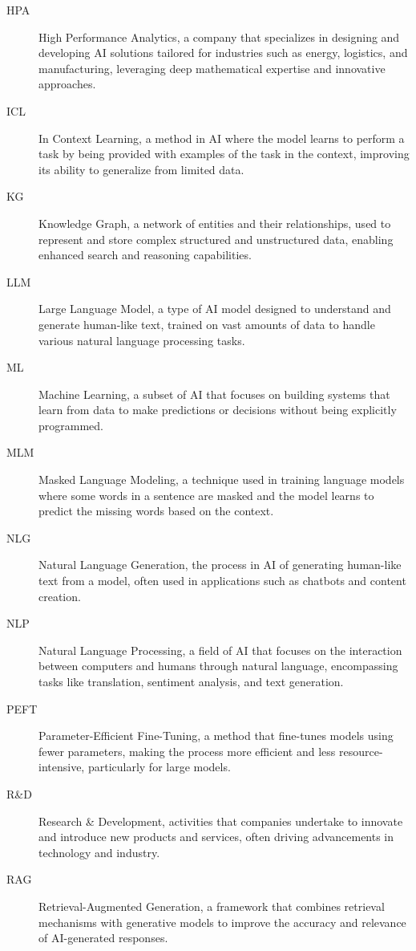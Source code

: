 \begin{description}
    \item[HPA] High Performance Analytics, a company that specializes in designing and developing AI solutions tailored for industries such as energy, logistics, and manufacturing, leveraging deep mathematical expertise and innovative approaches.
    \item[ICL] In Context Learning, a method in AI where the model learns to perform a task by being provided with examples of the task in the context, improving its ability to generalize from limited data.
    \item[KG] Knowledge Graph, a network of entities and their relationships, used to represent and store complex structured and unstructured data, enabling enhanced search and reasoning capabilities.
    \item[LLM] Large Language Model, a type of AI model designed to understand and generate human-like text, trained on vast amounts of data to handle various natural language processing tasks.
    \item[ML] Machine Learning, a subset of AI that focuses on building systems that learn from data to make predictions or decisions without being explicitly programmed.
    \item[MLM] Masked Language Modeling, a technique used in training language models where some words in a sentence are masked and the model learns to predict the missing words based on the context.
    \item[NLG] Natural Language Generation, the process in AI of generating human-like text from a model, often used in applications such as chatbots and content creation.
    \item[NLP] Natural Language Processing, a field of AI that focuses on the interaction between computers and humans through natural language, encompassing tasks like translation, sentiment analysis, and text generation.
    \item[PEFT] Parameter-Efficient Fine-Tuning, a method that fine-tunes models using fewer parameters, making the process more efficient and less resource-intensive, particularly for large models.
    \item[R\&D] Research \& Development, activities that companies undertake to innovate and introduce new products and services, often driving advancements in technology and industry.
    \item[RAG] Retrieval-Augmented Generation, a framework that combines retrieval mechanisms with generative models to improve the accuracy and relevance of AI-generated responses.

\end{description}
